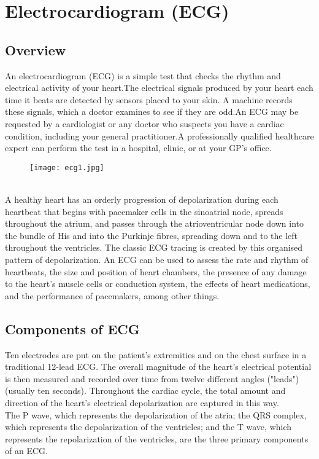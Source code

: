 \documentclass[12pt]{article}
\begin{document}
\section{Electrocardiogram (ECG)}
\subsection{Overview}
An electrocardiogram (ECG) is a simple test that checks the rhythm and electrical activity of your heart.The electrical signals produced by your heart each time it beats are detected by sensors placed to your skin.
A machine records these signals, which a doctor examines to see if they are odd.An ECG may be requested by a cardiologist or any doctor who suspects you have a cardiac condition, including your general practitioner.A professionally qualified healthcare expert can perform the test in a hospital, clinic, or at your GP's office.
\\
\begin{figure}[h]
\centering
\texttt{[image: ecg1.jpg]}
\label{fig_ecg1}
\end{figure}
\\
A healthy heart has an orderly progression of depolarization during each heartbeat that begins with pacemaker cells in the sinoatrial node, spreads throughout the atrium, and passes through the atrioventricular node down into the bundle of His and into the Purkinje fibres, spreading down and to the left throughout the ventricles. The classic ECG tracing is created by this organised pattern of depolarization. An ECG can be used to assess the rate and rhythm of heartbeats, the size and position of heart chambers, the presence of any damage to the heart's muscle cells or conduction system, the effects of heart medications, and the performance of pacemakers, among other things.
\\
\subsection{Components of ECG}
Ten electrodes are put on the patient's extremities and on the chest surface in a traditional 12-lead ECG. The overall magnitude of the heart's electrical potential is then measured and recorded over time from twelve different angles ("leads") (usually ten seconds). Throughout the cardiac cycle, the total amount and direction of the heart's electrical depolarization are captured in this way.
\\
The P wave, which represents the depolarization of the atria; the QRS complex, which represents the depolarization of the ventricles; and the T wave, which represents the repolarization of the ventricles, are the three primary components of an ECG.
\\
\end{document}
